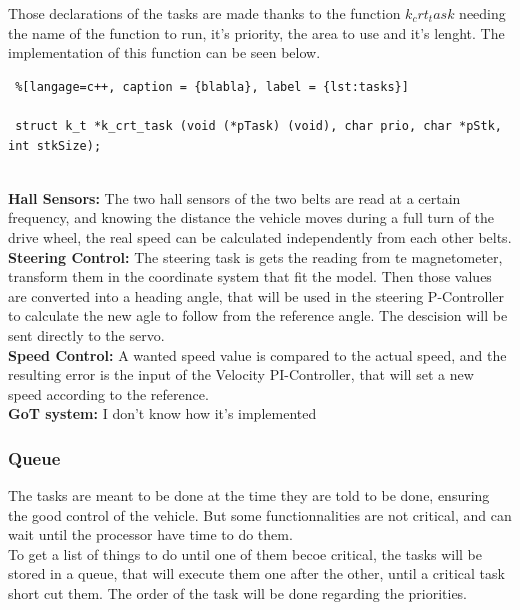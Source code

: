 Those declarations of the tasks are made thanks to the function $k_crt_task$ needing the name of the function to run, it's priority, the area to use and it's lenght. The implementation of this function can be seen below.


\begin{lstlisting} %[langage=c++, caption = {blabla}, label = {lst:tasks}]

 struct k_t *k_crt_task (void (*pTask) (void), char prio, char *pStk, int stkSize);
 
\end{lstlisting}


                       

\textbf{Hall Sensors:}
The two hall sensors of the two belts are read at a certain frequency, and knowing the distance the vehicle moves during a full turn of the drive wheel, the real speed can be calculated independently from each other belts.\\

\textbf{Steering Control:}
The steering task is gets the reading from te magnetometer, transform them in the coordinate system that fit the model. Then those values are converted into a heading angle, that will be used in the steering P-Controller to calculate the new agle to follow from the reference angle. The descision will be sent directly to the servo.\\

\textbf{Speed Control:}
A wanted speed value is compared to the actual speed, and the resulting error is the input of the Velocity PI-Controller, that will set a new speed according to the reference.\\

\textbf{GoT system:}
I don't know how it's implemented



\subsubsection{Queue}
The tasks are meant to be done at the time they are told to be done, ensuring the good control of the vehicle. But some functionnalities are not critical, and can wait until the processor have time to do them.\\
To get a list of things to do until one of them becoe critical, the tasks will be stored in a queue, that will execute them one after the other, until a critical task short cut them. The order of the task will be done regarding the priorities.


